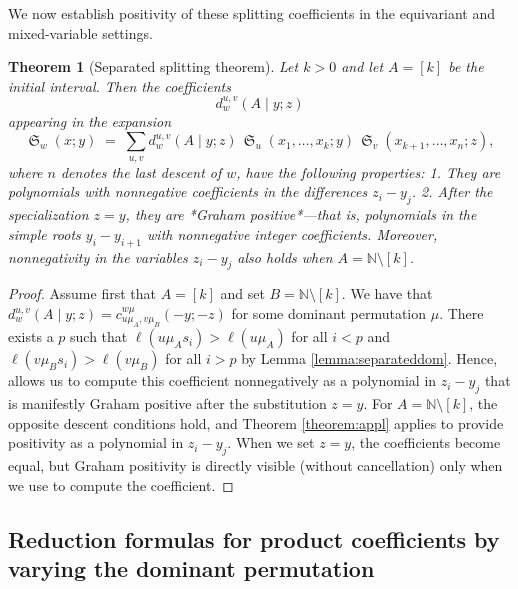 \documentclass[reqno]{amsart}
\newtheorem{theorem}{Theorem}[section]
\theoremstyle{definition}
\theoremstyle{remark}
\numberwithin{equation}{subsection}
\DeclareMathOperator{\sch}{\mathfrak{S}}
\newcommand{\cpcf}[5]{d^{#1,#2}_{#3}\left(#4\mid #5\right)}
\begin{document}
We now establish positivity of these splitting coefficients in the equivariant and mixed-variable settings.

\begin{theorem}[Separated splitting theorem]
Let $k>0$ and let $A=[k]$ be the initial interval. Then the coefficients
\[
\cpcf{u}{v}{w}{A}{y;z}
\]
appearing in the expansion
\[
\sch_w(x;y) \;=\; \sum_{u,v} \cpcf{u}{v}{w}{A}{y;z}\,
   \sch_u(x_{1},\ldots,x_k;y)\,
   \sch_v(x_{k+1},\ldots,x_n;z),
\]
where $n$ denotes the last descent of $w$, have the following properties:
1. They are polynomials with nonnegative coefficients in the differences $z_i-y_j$.
2. After the specialization $z=y$, they are *Graham positive*—that is, polynomials in the simple roots $y_i-y_{i+1}$ with nonnegative integer coefficients.  
Moreover, nonnegativity in the variables $z_i-y_j$ also holds when $A=\mathbb{N}\setminus[k]$.
\end{theorem}

\begin{proof}

Assume first that $A=[k]$ and set $B=\mathbb{N}\setminus [k]$. We have that $\cpcf{u}{v}{w}{A}{y;z}=c_{u\mu_A,v\mu_B}^{w\mu}(-y;-z)$ for some dominant permutation $\mu$. There exists a $p$ such that $\ell(u\mu_As_i)>\ell(u\mu_A)$ for all $i<p$ and $\ell(v\mu_Bs_i)>\ell(v\mu_B)$ for all $i>p$ by Lemma \ref{lemma:separateddom}. Hence, \cite[Theorem~3.1]{samuelmolev} allows us to compute this coefficient nonnegatively as a polynomial in $z_i-y_j$ that is manifestly Graham positive after the substitution $z=y$. For $A=\mathbb{N}\setminus [k]$, the opposite descent conditions hold, and Theorem \ref{theorem:appl} applies to provide positivity as a polynomial in $z_i-y_j$. When we set $z=y$, the coefficients become equal, but Graham positivity is directly visible (without cancellation) only when we use \cite[Theorem~3.1]{samuelmolev} to compute the coefficient.
\end{proof}


\subsection{Reduction formulas for product coefficients by varying the dominant permutation}
\end{document}
